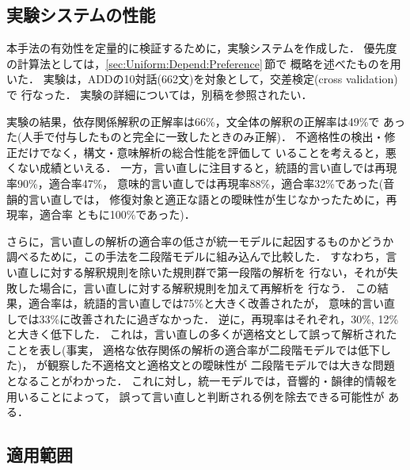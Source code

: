 \subsection{実験システムの性能}\label{sec:Evaluation:Experiment}

本手法の有効性を定量的に検証するために，実験システムを作成した．
優先度の計算法としては，\ref{sec:Uniform:Depend:Preference}\,節で
概略を述べたものを用いた．
実験は，ADDの10対話(662文)を対象として，交差検定(cross validation)で
行なった．
実験の詳細については，別稿\cite{伝:言処-投稿中}を参照されたい．

実験の結果，依存関係解釈の正解率は66\%，文全体の解釈の正解率は49\%で
あった(人手で付与したものと完全に一致したときのみ正解)．
不適格性の検出・修正だけでなく，構文・意味解析の総合性能を評価して
いることを考えると，悪くない成績といえる．
一方，言い直しに注目すると，統語的言い直しでは再現率90\%，適合率47\%，
意味的言い直しでは再現率88\%，適合率32\%であった(音韻的言い直しでは，
修復対象と適正な語との曖昧性が生じなかったために，再現率，適合率
ともに100\%であった)．

さらに，言い直しの解析の適合率の低さが統一モデルに起因するものかどうか
調べるために，この手法を二段階モデルに組み込んで比較した．
すなわち，言い直しに対する解釈規則を除いた規則群で第一段階の解析を
行ない，それが失敗した場合に，言い直しに対する解釈規則を加えて再解析を
行なう．
この結果，適合率は，統語的言い直しでは75\%と大きく改善されたが，
意味的言い直しでは33\%に改善されたに過ぎなかった．
逆に，再現率はそれぞれ，30\%, 12\%と大きく低下した．
これは，言い直しの多くが適格文として誤って解析されたことを表し(事実，
適格な依存関係の解析の適合率が二段階モデルでは低下した)，
が観察した不適格文と適格文との曖昧性が
二段階モデルでは大きな問題となることがわかった．
これに対し，統一モデルでは，音響的・韻律的情報を用いることによって，
誤って言い直しと判断される例を除去できる可能性が
ある\cite{O'Shaughnessy:ICSLP92-931,Nakatani:ACL93-46}．

\subsection{適用範囲}\label{sec:Evaluation:Limitation}

